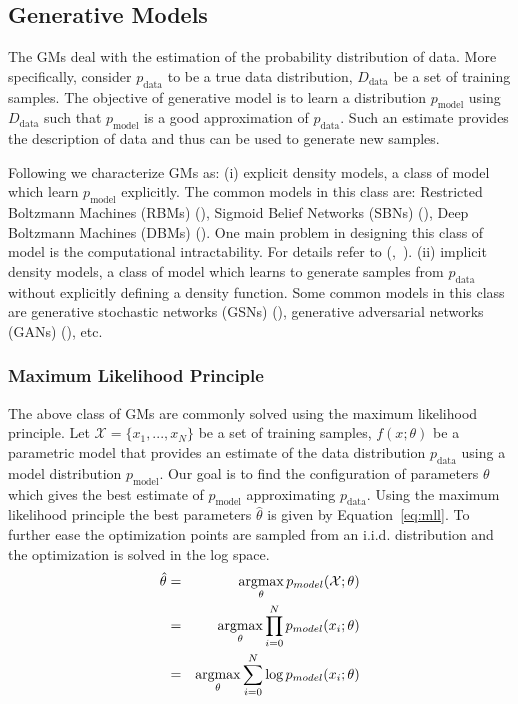 


\subsection{Generative Models}
\label{subsec:gm}
The GMs deal with the estimation of the probability distribution of data. 
More specifically, consider $p_\text{data}$ to be a true data distribution, $D_\text{data}$ be a set of training samples. The objective of generative model is to learn a distribution $p_\text{model}$ using $D_\text{data}$ such that $p_\text{model}$ is a good approximation of $p_\text{data}$. Such an estimate provides the description of data and thus can be used to generate new samples.

Following \cite{goodfellow2016nips} we characterize GMs as: (i) explicit density models, a class of model which learn $p_\text{model}$ explicitly. The common models in this class are: Restricted Boltzmann Machines (RBMs) (\cite{salakhutdinov2007restricted}), Sigmoid Belief Networks (SBNs) (\cite{hinton2009deep}), Deep Boltzmann Machines (DBMs) (\cite{salakhutdinov2009deep}). One main problem in designing this class of model is the computational intractability. For details refer to (\cite{salakhutdinov2015learning},~\cite{goodfellow2016nips}).
(ii) implicit density models, a class of model which learns to generate samples from $p_\text{data}$ without explicitly defining a density function. Some common models in this class are generative stochastic networks (GSNs) (\cite{bengio2014deep}), generative adversarial networks (GANs) (\cite{goodfellow2014generative}), etc.

\subsubsection{Maximum Likelihood Principle}
\label{sub:mll}
The above class of GMs are commonly solved using the maximum likelihood principle.
Let $\mathcal{X}=\{x_1,...,x_N\}$ be a set of training samples, $f(x;\theta)$ be a parametric model that provides an estimate of the data distribution $p_\text{data}$ using a model distribution $p_\text{model}$.  Our goal is to find the configuration of parameters $\theta$ which gives the best estimate of $p_\text{model}$ approximating $p_\text{data}$. Using the maximum likelihood principle the best parameters $\hat{\theta}$ is given by Equation~\ref{eq:mll}. To further ease the optimization points are sampled from an i.i.d. distribution and the optimization is solved in the log space.
\begin{eqnarray}
     \label{eq:mll}
    \hat{\theta} & = & \operatorname*{argmax}_{\theta}p_{model}(\mathcal{X};\theta)\\
     &= & \operatorname*{argmax}_{\theta} \prod_{i=0}^N p_{model}(x_i;\theta)\\
     &= & \operatorname*{argmax}_{\theta} \sum_{i=0}^N \log p_{model}(x_i;\theta)
\end{eqnarray}


